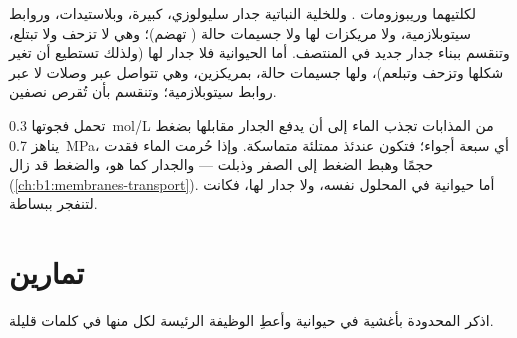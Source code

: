 \begin{proposition}\label{prop:b1:eukaryotic-cell:compare}
لكلتيهما     
وريبوزومات . وللخلية النباتية جدار سليولوزي،  كبيرة،
وبلاستيدات، وروابط سيتوبلازمية، ولا مريكزات لها ولا جسيمات حالة
( تهضم)؛ وهي لا تزحف ولا تبتلع، وتنقسم ببناء جدار جديد في
المنتصف. أما  الحيوانية فلا جدار لها (ولذلك تستطيع أن تغير
شكلها وتزحف وتبلعم)، ولها جسيمات حالة،  بمريكزين، وهي
تتواصل عبر وصلات لا عبر روابط سيتوبلازمية؛ وتنقسم بأن تُقرص نصفين.
\end{proposition}

\begin{example}[الامتلاء]\label{ex:b1:eukaryotic-cell:turgor}
  تحمل فجوتها \qty{0.3}{mol/L} من المذابات تجذب الماء إلى
أن يدفع الجدار مقابلها بضغط يناهز \qty{0.7}{MPa}، أي سبعة أجواء؛
فتكون  عندئذ ممتلئة  متماسكة. وإذا حُرمت الماء فقدت
 حجمًا وهبط الضغط إلى الصفر وذبلت  --- والجدار كما هو،
والضغط قد زال (\cref{ch:b1:membranes-transport}). أما  حيوانية
في المحلول نفسه، ولا جدار لها، فكانت لتنفجر ببساطة.
\end{example}

\section{تمارين}

\begin{exercise}[$\star$]\label{exo:b1:eukaryotic-cell:1}
اذكر  المحدودة بأغشية في  حيوانية وأعطِ الوظيفة الرئيسة
لكل منها في كلمات قليلة.
\end{exercise}

